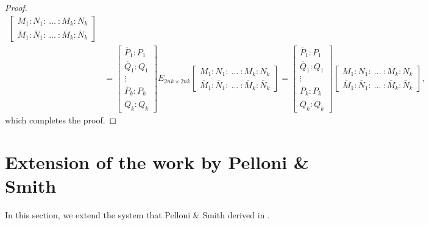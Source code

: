 \documentclass[10pt,reqno,oneside,a4paper]{article}
\begin{document}
\begin{proof}
\begin{align*}
\begin{bmatrix}
M_1 : N_1 :~ \ldots ~: M_k : N_k \\
\overline{M}_1 : \overline{N}_1 :~ \ldots ~: \overline{M}_k : \overline{N}_k 
\end{bmatrix} \\
&= \begin{bmatrix}
\overline{P}_1 : P_1 \\
\overline{Q}_1 : Q_1 \\
\vdots \\
\overline{P}_k : P_k \\
\overline{Q}_k : Q_k 
\end{bmatrix} E_{2nk \times 2nk}
\begin{bmatrix}
M_1 : N_1 :~ \ldots ~: M_k : N_k \\
\overline{M}_1 : \overline{N}_1 :~ \ldots ~: \overline{M}_k : \overline{N}_k
\end{bmatrix} =\begin{bmatrix}
\overline{P}_1 : P_1 \\
\overline{Q}_1 : Q_1 \\
\vdots \\
\overline{P}_k : P_k \\
\overline{Q}_k : Q_k 
\end{bmatrix}
\begin{bmatrix}
M_1 : N_1 :~ \ldots ~: M_k : N_k \\
\overline{M}_1 : \overline{N}_1 :~ \ldots ~: \overline{M}_k : \overline{N}_k 
\end{bmatrix},
\end{align*}
which completes the proof.
\end{proof}

\section{Extension of the work by Pelloni \& Smith}
In this section, we extend the system that Pelloni \& Smith derived in \cite{PS2018}. 
\end{document}
